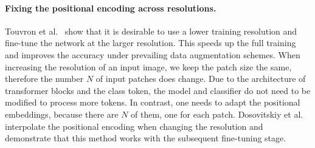 \paragraph{Fixing the positional encoding across resolutions. }
\label{sec:position_encoding}

Touvron et al.~\cite{Touvron2019FixRes} show that it is  desirable to use a lower training resolution and fine-tune the network at the larger resolution. %
This speeds up the full training and improves the accuracy under prevailing data augmentation schemes. 
%
When increasing the resolution of an input image, we keep the patch size the same, 
%
% 
therefore the number $N$ of input patches does change.
Due to the architecture of transformer blocks and the class token, the model and classifier do not need to be modified to process more tokens.
In contrast, one needs to adapt the positional embeddings, because there are $N$ of them, one for each patch. 
Dosovitskiy et al.~\cite{dosovitskiy2020image}  interpolate the positional encoding when changing the resolution and demonstrate that this method works with the subsequent fine-tuning stage. 

